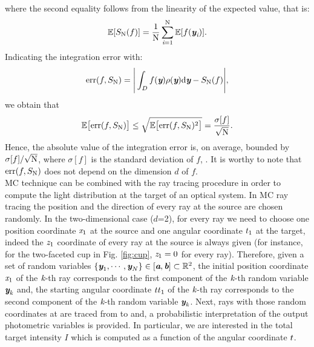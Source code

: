 where the second equality follows from the linearity of the expected value, that is:
\begin{equation}
\mathbb{E}[S_{\textrm{N}}(f)] = \frac{1}{\textrm{N}}\sum_{\textit{i}=1}^{\textrm{N}}\mathbb{E}[ f(\textit{\textbf{y}}_{\textit{i}})].
\end{equation}
Indicating the integration error with:
\begin{equation}
\textrm{err}(f, S_{\textrm{N}}) =\Bigg|\int_{D}f(\textit{\textbf{y}})\rho(\textit{\textbf{y}}) \textrm{d}\textit{\textbf{y}}-S_{\textrm{N}}(f)\Bigg|,
\end{equation}
we obtain that
\begin{equation}\label{eq:mean_error}
\mathbb{E}\big[\textrm{err}(f, S_{\textrm{N}})\big]\leq\sqrt{\mathbb{E}\big[\textrm{err}(f, S_{\textrm{N}})^2\big]} = \frac{\sigma[f]}{\sqrt{\textrm{N}}}.
\end{equation}
Hence, the absolute value of the integration error is, on average, bounded by $\sigma[f]/\sqrt{\textrm{N}}$, where $\sigma[f]$ is the standard deviation of $f$, \cite{leobacher2014introduction}. It is worthy to note that $\textrm{err}(f, S_{\textrm{N}})$ does not depend on the dimension $d$ of $f$.
\\ \indent MC technique can be combined with the ray tracing procedure in order to compute the light distribution at the target of an optical system.
In MC ray tracing the position and the direction of  every ray at the source are chosen randomly. 
In the two-dimensional case ($d$=2), for every ray we need to choose one position coordinate $\textit{x}_1$ at the source and one angular coordinate $t_1$ at the target, indeed the $\textit{z}_1$ coordinate of every ray at the source is always given (for instance, for the two-faceted cup in Fig. \ref{fig:cup}, $\textit{z}_1=0$ for every ray). 
Therefore, given a set of random variables $\{\textit{\textbf{y}}_1, \cdots, \textit{\textbf{y}}_N\}\in [\textit{\textbf{a}}, \textit{\textbf{b}}]\subset\mathbb{R}^2$, the initial position coordinate $\textit{x}_1$ of the $\textit{k}$-th ray corresponds to the first component of the $\textit{k}$-th random variable $\textit{\textbf{y}}_{\textit{k}}$ and, the starting angular coordinate $t{t}_1$ of the $\textit{k}$-th ray corresponds to the second component of the $\textit{k}$-th random variable $\textit{\textbf{y}}_{\textit{k}}$.
Next, rays with those random coordinates at  are traced from  to  and, a probabilistic interpretation of the output photometric variables is provided.
In particular, we are interested in the total target intensity $I$ which is computed as a function of the angular coordinate $t$.
